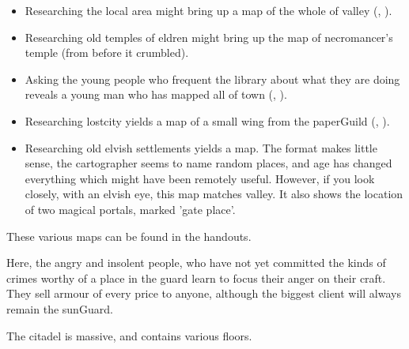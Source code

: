 \begin{multicols}{2}
\begin{itemize}
  \item
  Researching the local area might bring up a map of the whole of \gls{valley} (, \tn[14]).
  \item
  Researching old temples of \gls{eldren} might bring up the map of \gls{necromancer}'s temple (from before it crumbled).
  \item
  Asking the young people who frequent the library about what they are doing reveals a young man who has mapped all of \gls{town} (, \tn[10]).
  \item
  Researching \gls{lostcity} yields a map of a small wing from the \gls{paperGuild} (, \tn[18]).
  \item
  Researching old elvish settlements yields a map.
  The format makes little sense, the cartographer seems to name random places, and age has changed everything which might have been remotely useful.
  However, if you look closely, with an elvish eye, this map matches \gls{valley}.
  It also shows the location of two magical portals, marked 'gate place'.
\end{itemize}

These various maps can be found in the handouts.


Here, the angry and insolent people, who have not yet committed the kinds of crimes worthy of a place in the \gls{guard} learn to focus their anger on their craft.
They sell armour of every price to anyone, although the biggest client will always remain the \gls{sunGuard}.


The citadel is massive, and contains various floors.


\end{multicols}
